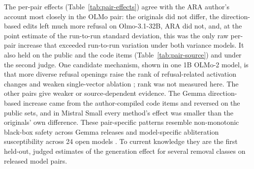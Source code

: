 The per-pair effects (Table~\ref{tab:pair-effects}) agree with the ARA
author's account \cite{weidmann2026ara} most closely in the OLMo pair: the
originals did not differ, the direction-based edits left much more refusal on
Olmo-3.1-32B, ARA did not, and, at the point estimate of the run-to-run
standard deviation, this was the only raw per-pair increase that exceeded
run-to-run variation under both variance models. It also held on the
public and the code items (Table~\ref{tab:pair-source}) and under the second
judge. One candidate mechanism, shown in one 1B OLMo-2 model, is that more
diverse refusal openings raise the rank of refusal-related activation changes
and weaken single-vector ablation \cite{labunets2026refusal}; rank was not
measured here. The other pairs give weaker or source-dependent evidence. The
Gemma direction-based increase came from the author-compiled code items and
reversed on the public sets, and in Mistral Small every method's effect was
smaller than the originals' own difference. These pair-specific patterns
resemble non-monotonic black-box safety across Gemma releases
\cite{mitra2026cross} and model-specific abliteration susceptibility across 24
open models \cite{hadetskyi2026not}. To current knowledge they are the first
held-out, judged estimates of the generation effect for several removal
classes on released model pairs.

